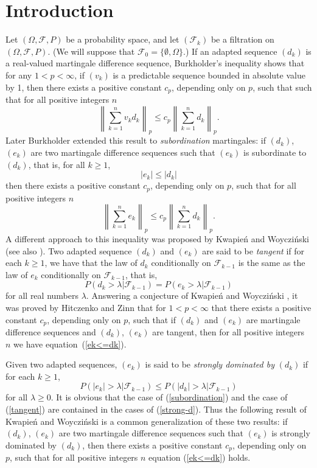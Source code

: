 \documentclass[12pt]{amsart}
\begin{document}
\section{Introduction}
Let $(\Omega ,\mathcal{F},P)$ be a probability space, and let
$(\mathcal{F}_k)$ be a filtration on $(\Omega ,\mathcal{F},P)$.
(We will suppose that $\mathcal{F}_0 = \{\emptyset,\Omega\}$.) If
an adapted sequence $(d_k)$ is a real-valued martingale difference
sequence, Burkholder's inequality \cite{B2} shows that for any
$1<p<\infty$, if $(v_k)$ is a predictable sequence bounded in
absolute value by 1, then there exists a positive constant $c_p$,
depending only on $p$, such that such that for all positive
integers $n$
\[ \left \| \sum_{k=1}^n v_k d_k \right\|_p
\leq c_p \left\| \sum_{k=1}^n d_k \right\|_p .\]
Later Burkholder \cite{B3} extended this result to
\emph{subordination} martingales: if $(d_k)$, $(e_k)$ are two
martingale difference sequences such that $(e_k)$ is subordinate
to $(d_k)$, that is, for all $k \geq 1$,
\begin{equation}
\label{subordination}|e_k|\leq |d_k|
\end{equation}
then there exists a positive constant $c_p$, depending only on
$p$, such that for all positive integers $n$
\begin{equation}
\label{ek<=dk} \left\|\sum_{k=1}^n e_k \right\|_p \leq c_p \left\|
\sum_{k=1}^n d_k \right\|_p.
\end{equation}
A different approach to this inequality was proposed by Kwapie\'n
and Woyczi\'{n}ski \cite{KW1} (see also \cite{KW2}). Two adapted
sequence $(d_k)$ and $(e_k)$ are said to be \emph{tangent} if for
each $k\geq 1$, we have that the law of $d_k$ conditionally on $
\mathcal{F}_{k-1} $ is the same as the law of $e_k$ conditionally
on $\mathcal{F}_{k-1}$, that is,
\begin{equation}
\label{tangent}P(d_k > \lambda | \mathcal{F}_{k-1})= P(e_k >
\lambda | \mathcal{F}_{k-1})
\end{equation}
for all real numbers $\lambda $. Answering a conjecture of
Kwapie\'n and Woyczi\'nski \cite{KW1}, it was proved by Hitczenko
\cite{H1} and Zinn \cite{Z} that for $1<p<\infty$ that there
exists a positive constant $c_p$, depending only on $p$, such that
if $(d_k)$ and $(e_k)$ are martingale difference sequences and
$(d_k)$, $(e_k)$ are tangent, then for all positive integers $n$
we have equation~(\ref{ek<=dk}).

Given two adapted sequences, $(e_k)$ is said to be \emph{strongly
dominated by} $(d_k)$ if for each $k\geq 1$,
\begin{equation}
\label{strong-d}P(|e_k| > \lambda | \mathcal{F}_{k-1})\leq P(|d_k|
> \lambda | \mathcal{F}_{k-1})
\end{equation}
for all $\lambda \geq 0$. It is obvious that the case of
(\ref{subordination}) and the case of (\ref{tangent}) are
contained in the cases of (\ref{strong-d}). Thus the following result of
Kwapie\'n and
Woyczi\'nski \cite{KW1} is a common generalization of these
two results: if $(d_k)$, $(e_k)$ are two martingale difference
sequences such that $(e_k)$ is strongly dominated by $(d_k)$, then
there exists a positive constant $c_p$, depending only on $p$,
such that for all positive integers $n$ equation (\ref{ek<=dk})
holds.
\end{document}
